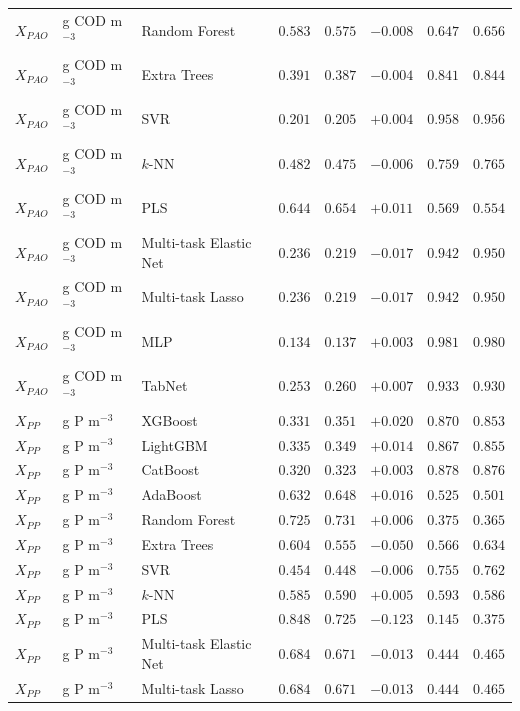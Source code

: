 \begin{longtable}{llp{3.1cm}rrrrr}
$X_{PAO}$ & g COD m$^{-3}$ & Random Forest & $0.583$ & $0.575$ & $-0.008$ & $0.647$ & $0.656$ \\
$X_{PAO}$ & g COD m$^{-3}$ & Extra Trees & $0.391$ & $0.387$ & $-0.004$ & $0.841$ & $0.844$ \\
$X_{PAO}$ & g COD m$^{-3}$ & SVR & $0.201$ & $0.205$ & $+0.004$ & $0.958$ & $0.956$ \\
$X_{PAO}$ & g COD m$^{-3}$ & $k$-NN & $0.482$ & $0.475$ & $-0.006$ & $0.759$ & $0.765$ \\
$X_{PAO}$ & g COD m$^{-3}$ & PLS & $0.644$ & $0.654$ & $+0.011$ & $0.569$ & $0.554$ \\
$X_{PAO}$ & g COD m$^{-3}$ & Multi-task Elastic Net & $0.236$ & $0.219$ & $-0.017$ & $0.942$ & $0.950$ \\
$X_{PAO}$ & g COD m$^{-3}$ & Multi-task Lasso & $0.236$ & $0.219$ & $-0.017$ & $0.942$ & $0.950$ \\
$X_{PAO}$ & g COD m$^{-3}$ & MLP & $0.134$ & $0.137$ & $+0.003$ & $0.981$ & $0.980$ \\
$X_{PAO}$ & g COD m$^{-3}$ & TabNet & $0.253$ & $0.260$ & $+0.007$ & $0.933$ & $0.930$ \\
$X_{PP}$ & g P m$^{-3}$ & XGBoost & $0.331$ & $0.351$ & $+0.020$ & $0.870$ & $0.853$ \\
$X_{PP}$ & g P m$^{-3}$ & LightGBM & $0.335$ & $0.349$ & $+0.014$ & $0.867$ & $0.855$ \\
$X_{PP}$ & g P m$^{-3}$ & CatBoost & $0.320$ & $0.323$ & $+0.003$ & $0.878$ & $0.876$ \\
$X_{PP}$ & g P m$^{-3}$ & AdaBoost & $0.632$ & $0.648$ & $+0.016$ & $0.525$ & $0.501$ \\
$X_{PP}$ & g P m$^{-3}$ & Random Forest & $0.725$ & $0.731$ & $+0.006$ & $0.375$ & $0.365$ \\
$X_{PP}$ & g P m$^{-3}$ & Extra Trees & $0.604$ & $0.555$ & $-0.050$ & $0.566$ & $0.634$ \\
$X_{PP}$ & g P m$^{-3}$ & SVR & $0.454$ & $0.448$ & $-0.006$ & $0.755$ & $0.762$ \\
$X_{PP}$ & g P m$^{-3}$ & $k$-NN & $0.585$ & $0.590$ & $+0.005$ & $0.593$ & $0.586$ \\
$X_{PP}$ & g P m$^{-3}$ & PLS & $0.848$ & $0.725$ & $-0.123$ & $0.145$ & $0.375$ \\
$X_{PP}$ & g P m$^{-3}$ & Multi-task Elastic Net & $0.684$ & $0.671$ & $-0.013$ & $0.444$ & $0.465$ \\
$X_{PP}$ & g P m$^{-3}$ & Multi-task Lasso & $0.684$ & $0.671$ & $-0.013$ & $0.444$ & $0.465$ \\

\end{longtable}
